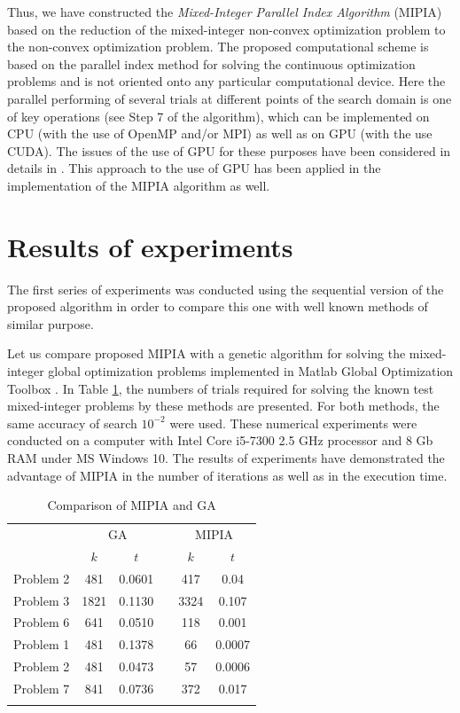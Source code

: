\documentclass{llncs}
\begin{document}
Thus, we have constructed the \textit{Mixed-Integer Parallel Index Algorithm} \break 
(MIPIA) based on the  reduction of the mixed-integer non-convex optimization problem to the non-convex optimization problem. 
The proposed computational scheme is based on the parallel index method for solving the 
continuous optimization problems and is not oriented onto any particular computational device. 
Here the parallel performing of several trials at different points of the search domain is one of 
key operations (see Step 7 of the algorithm), which can be implemented on CPU (with the use 
of OpenMP and/or MPI) as well as on GPU (with the use CUDA). The issues of the use of 
GPU for these purposes have been considered in details in 
\cite{Barkalov2016,Gergel2016}. This approach to the use of GPU has been applied in 
the implementation of the MIPIA algorithm as well.


\section{Results of experiments}
The first series of experiments was conducted using the sequential version of the proposed 
algorithm in order to compare this one with well known methods of similar purpose.

Let us compare proposed MIPIA with a genetic algorithm for solving the mixed-integer global 
optimization problems implemented in Matlab Global Optimization Toolbox \cite{Matlab}. In 
Table \ref{tab:1}, the numbers of trials required for solving the known test mixed-integer 
problems by these methods are presented. For both methods, the same accuracy of search 
$10^{-2}$ were used. These numerical experiments were conducted on a 
computer with Intel Core i5-7300 2.5 GHz processor and 8 Gb RAM under MS Windows 10. 
The results of experiments have demonstrated the advantage of MIPIA in the number 
of iterations as well as in the execution time.

\begin{table}
	\caption{Comparison of MIPIA and GA}
	\label{tab:1}
	\center
	\begin{tabular}{cccccc}
		\hline\noalign{\smallskip}
	\multirow{2}{*}{Test problem}	 & \multicolumn{2}{c}{ GA } & & 
\multicolumn{2}{c}{MIPIA} \\
		\noalign{\smallskip} \cline{2-3} \cline{5-6} \noalign{\smallskip}
		 & $k$ & $t$ & & $k$ & $t$  \\
		\noalign{\smallskip} \hline \noalign{\smallskip}
		 Problem 2 \cite{Floudas}&	481 &	0.0601 & &	417 &	0.04 \\
		 Problem 3 \cite{Floudas}& 	1821 &	0.1130 & & 3324 &	0.107 \\
		 Problem 6 \cite{Floudas}&	641 &	0.0510 & &	118 &	0.001 \\
		 Problem 1 \cite{Deep}   &	481 &	0.1378 & &	66 &	0.0007 \\
		 Problem 2 \cite{Deep}   &	481 &	0.0473 & &	57 &	0.0006 \\
		 Problem 7 \cite{Deep}   &	841 &	0.0736 & & 372	 &	0.017 \\
		\noalign{\smallskip}\hline
	\end{tabular}
\end{table}
\end{document}
